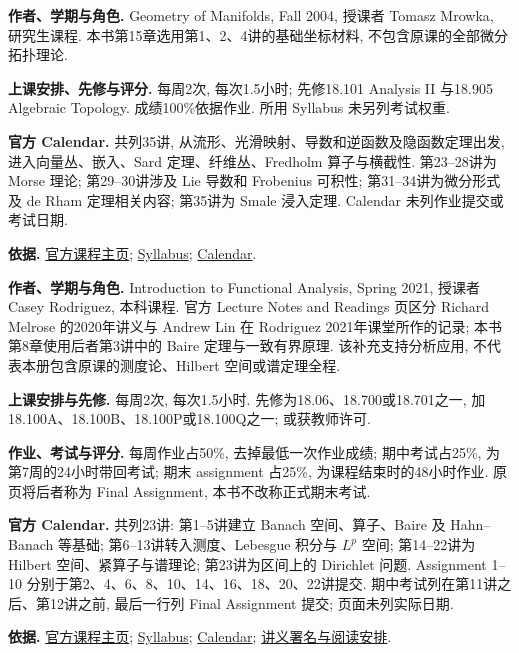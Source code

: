 \textbf{作者、学期与角色.} Geometry of Manifolds, Fall 2004, 授课者 Tomasz Mrowka, 研究生课程. 本书第15章选用第1、2、4讲的基础坐标材料, 不包含原课的全部微分拓扑理论.

\textbf{上课安排、先修与评分.} 每周2次, 每次1.5小时; 先修18.101 Analysis II 与18.905 Algebraic Topology. 成绩100\%依据作业. 所用 Syllabus 未另列考试权重.

\textbf{官方 Calendar.} 共列35讲, 从流形、光滑映射、导数和逆函数及隐函数定理出发, 进入向量丛、嵌入、Sard 定理、纤维丛、Fredholm 算子与横截性. 第23--28讲为 Morse 理论; 第29--30讲涉及 Lie 导数和 Frobenius 可积性; 第31--34讲为微分形式及 de Rham 定理相关内容; 第35讲为 Smale 浸入定理. Calendar 未列作业提交或考试日期.

\textbf{依据.} \href{https://ocw.mit.edu/courses/18-965-geometry-of-manifolds-fall-2004/}{官方课程主页}; \href{https://ocw.mit.edu/courses/18-965-geometry-of-manifolds-fall-2004/pages/syllabus/}{Syllabus}; \href{https://ocw.mit.edu/courses/18-965-geometry-of-manifolds-fall-2004/pages/calendar/}{Calendar}.

\par\addvspace{9pt}
\par\nobreak\vspace{4pt}

\textbf{作者、学期与角色.} Introduction to Functional Analysis, Spring 2021, 授课者 Casey Rodriguez, 本科课程. 官方 Lecture Notes and Readings 页区分 Richard Melrose 的2020年讲义与 Andrew Lin 在 Rodriguez 2021年课堂所作的记录; 本书第8章使用后者第3讲中的 Baire 定理与一致有界原理. 该补充支持分析应用, 不代表本册包含原课的测度论、Hilbert 空间或谱定理全程.

\textbf{上课安排与先修.} 每周2次, 每次1.5小时. 先修为18.06、18.700或18.701之一, 加18.100A、18.100B、18.100P或18.100Q之一; 或获教师许可.

\textbf{作业、考试与评分.} 每周作业占50\%, 去掉最低一次作业成绩; 期中考试占25\%, 为第7周的24小时带回考试; 期末 assignment 占25\%, 为课程结束时的48小时作业. 原页将后者称为 Final Assignment, 本书不改称正式期末考试.

\textbf{官方 Calendar.} 共列23讲: 第1--5讲建立 Banach 空间、算子、Baire 及 Hahn--Banach 等基础; 第6--13讲转入测度、Lebesgue 积分与 $L^p$ 空间; 第14--22讲为 Hilbert 空间、紧算子与谱理论; 第23讲为区间上的 Dirichlet 问题. Assignment 1--10 分别于第2、4、6、8、10、14、16、18、20、22讲提交. 期中考试列在第11讲之后、第12讲之前, 最后一行列 Final Assignment 提交; 页面未列实际日期.

\textbf{依据.} \href{https://ocw.mit.edu/courses/18-102-introduction-to-functional-analysis-spring-2021/}{官方课程主页}; \href{https://ocw.mit.edu/courses/18-102-introduction-to-functional-analysis-spring-2021/pages/syllabus/}{Syllabus}; \href{https://ocw.mit.edu/courses/18-102-introduction-to-functional-analysis-spring-2021/pages/calendar/}{Calendar}; \href{https://ocw.mit.edu/courses/18-102-introduction-to-functional-analysis-spring-2021/pages/lecture-notes-and-readings/}{讲义署名与阅读安排}.
